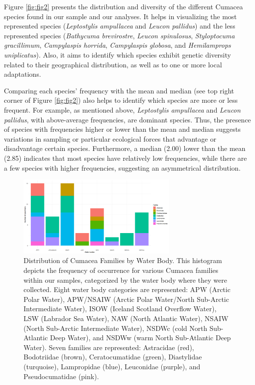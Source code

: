 Figure \ref{fig:fig2} presents the distribution and diversity of the different Cumacea species found in our sample and our analyses. It helps in visualizing the most represented species (\emph{Leptostylis ampullacea} and \emph{Leucon pallidus}) and the less represented species (\emph{Bathycuma brevirostre}, \emph{Leucon spinulosus}, \emph{Styloptocuma gracillimum}, \emph{Campylaspis horrida}, \emph{Campylaspis globosa}, and \emph{Hemilamprops uniplicatus}). Also, it aims to identify which species exhibit genetic diversity related to their geographical distribution, as well as to one or more local adaptations.

Comparing each species' frequency with the mean and median (see top right corner of Figure \ref{fig:fig2}) also helps to identify which species are more or less frequent. For example, as mentioned above, \emph{Leptostylis ampullacea} and \emph{Leucon pallidus}, with above-average frequencies, are dominant species. Thus, the presence of species with frequencies higher or lower than the mean and median suggests variations in sampling or particular ecological forces that advantage or disadvantage certain species. Furthermore, a median (2.00) lower than the mean (2.85) indicates that most species have relatively low frequencies, while there are a few species with higher frequencies, suggesting an asymmetrical distribution. 

\begin{figure}[htbp]
    \centering
    \includegraphics[width=0.7\textwidth]{figure3.png}
    \caption{Distribution of Cumacea Families by Water Body. This histogram depicts the frequency of occurrence for various Cumacea families within our samples, categorized by the water body where they were collected. Eight water body categories are represented: APW (Arctic Polar Water), APW/NSAIW (Arctic Polar Water/North Sub-Arctic Intermediate Water), ISOW (Iceland Scotland Overflow Water), LSW (Labrador Sea Water), NAW (North Atlantic Water), NSAIW  (North Sub-Arctic Intermediate Water), NSDWc (cold North Sub-Atlantic Deep Water), and NSDWw (warm North Sub-Atlantic Deep Water). Seven families are represented: Astracidae (red), Bodotriidae (brown), Ceratocumatidae (green), Diastylidae (turquoise), Lampropidae (blue), Leuconidae (purple), and Pseudocumatidae (pink). \label{fig:fig3}}
\end{figure}

